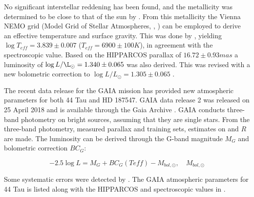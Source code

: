 

No significant interstellar reddening has been found, and the metallicity was determined to be close to that of the sun by \citet{mcnamara1985relations}. From this metallicity the Vienna NEMO grid (Model Grid of Stellar Atmospheres, \citet{nendwich2004interpolation}, \citet{heiter2002new}) can be employed to derive an effective temperature and surface gravity. This was done by \citet{lenz2008asteroseismic}, yielding $ \log T_{eff}= 3.839 \pm 0.007$ ($T_{eff} = 6900 \pm 100 K$), in agreement with the spectroscopic value. Based on the HIPPARCOS parallax of $16.72\pm 0.93 mas$ a luminosity of $\log L/\L_\odot = 1.340 \pm 0.065$ was also derived. This was revised with a new bolometric correction to $\log L/L_\odot = 1.305 \pm 0.065$ \citep{lenz2010delta}. 

The recent data release for the GAIA mission has provided new atmospheric parameters for both 44 Tau and HD 187547. GAIA data release 2 was released on 25 April 2018 and is available through the Gaia Archive \citep{brown2018gaia}. GAIA conducts three-band photometry on bright sources, assuming that they are single stars. From the three-band photometry, measured parallax and training sets, estimates on \teff and $R$ are made. 
The luminosity can be derived through the G-band magnitude $M_G$ and bolometric correction $BC_G$:

\begin{equation}
	-2.5\log L = M_G + BC_G(Teff) - M_{bol,\odot}, \quad M_{bol,\odot}
\end{equation}

Some systematic errors were detected by \citet{andrae2018gaia}. The GAIA atmospheric parameters for 44 Tau is listed along with the HIPPARCOS and spectroscopic values in . 

